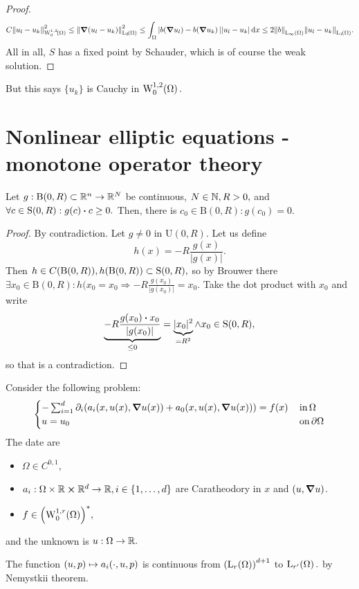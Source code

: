 \documentclass{article}
\begin{document}
\begin{example}
\begin{proof}
		\[
			C \norm{u_l - u_k}_{\WkpzeroSet[1][2]{\Omega}}^{2} \leq	\norm{\grad\qty(u_l - u_k)}_{\LpSet[2]{\Omega}}^{2} \leq \int_{\Omega}|b(\grad u_l) - b\qty(\grad u_k)| |u_l - u_k|\dd{x} \leq 2 \norm{b}_{\LinfSet{\Omega}}\norm{u_l-u_k}_{\LpSet[1]{\Omega}}.
		\]
		All in all, $S$ has a fixed point by Schauder, which is of course the weak solution.
	\end{proof}
	But this says $\{u_k\}$ is Cauchy in $\WkpzeroSet[1][2]{\Omega}.$
\end{example}

\section{Nonlinear elliptic equations - monotone operator theory}
\label{sec:monotone_operator}

\begin{lemma}
	Let $g: \text{B}(0,R) \subset {\mathbb R}^n \to {\mathbb R}^N$ be continuous, $N \in {\mathbb N}, R>0,$ and $\forall c \in \text{S}(0,R): g(c) \vdot c \geq 0.$ Then, there is $c_0 \in \text{B}(0,R): g(c_0) = 0.$
	\begin{proof}
		By contradiction. Let $g \neq 0$ in $\text{U}(0,R)$. Let us define
		\[
			h(x) = -R\frac{g(x)}{|g(x)|}.
		\]
		Then $h \in C\qty(\text{B}(0,R)), h\qty(\text{B}(0,R)) \subset \text{S}(0,R),$ so by Brouwer there $\exists x_0 \in \text{B}(0,R): h(x_0 = x_0 \Rightarrow -R \frac{g(x_0)}{|g(x_0)|} = x_0.$ Take the dot product with $x_0$ and write
		\[
			\underbrace{-R \frac{g(x_0) \vdot x_0}{|g(x_0)|}}_{\leq 0} = \underbrace{|x_0|^{2}}_{ = R^{2}} \wedge x_0 \in \text{S}(0,R),
		\]
		so that is a contradiction.
	\end{proof}
\end{lemma}

Consider the following problem:
\[
	\begin{cases} 
		- \sum_{i=1}^d \partial_{i}\qty(a_i\qty(x,u(x),\grad u(x)) + a_0\qty(x,u(x),\grad u(x))) = f(x) & \, \text{in} \, \Omega \\
		u = u_0 & \, \text{on} \, \partial \Omega 
	\end{cases}
\]
The date are
\begin{itemize}
	\item $\Omega \in C^{0,1},$
	\item $a_i: \Omega \times {\mathbb R} \cross {\mathbb R}^d \to {\mathbb R}, i \in \{1,\dots,d\}$ are Caratheodory in $x$ and $(u,\grad u)$.
	\item $f \in \qty(\WkpzeroSet[1][r]{\Omega})^{*},$
\end{itemize}
and the unknown is $u: \Omega \to {\mathbb R}.$
\begin{remark}
	The function $(u,p) \mapsto a_i\qty(\cdot, u, p)$ is continuous from $\qty(\LpSet[r]{\Omega})^{d+1}$ to $\LpSet[r']{\Omega}.$ by Nemystkii theorem.
\end{remark}
\end{document}
